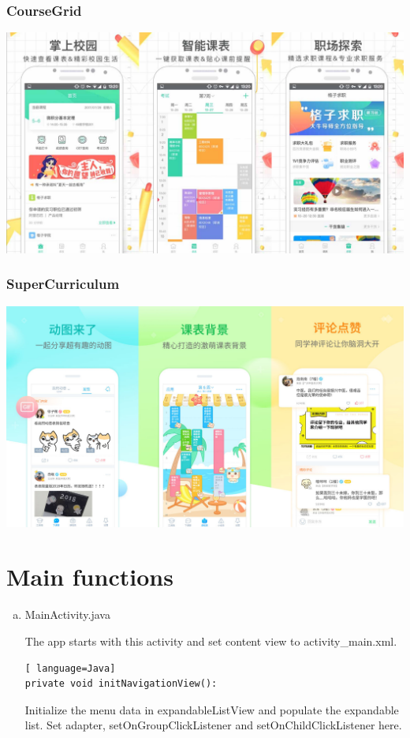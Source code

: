 \documentclass{article}
\begin{document}
    \subsubsection{CourseGrid}
    \begin{center}
        \includegraphics[width=6.5in]{CourseGrid}
    \end{center}

    \subsubsection{SuperCurriculum}
    \begin{center}
        \includegraphics[width=6.5in]{SuperCurriculum}
    \end{center}

    \section{Main functions}

    \begin{enumerate}[a)]
    \item MainActivity.java
    
    The app starts with this activity and 
    set content view to activity\_main.xml.

    \begin{lstlisting}[ language=Java]
private void initNavigationView():
    \end{lstlisting}
    Initialize the menu data in expandableListView and populate the expandable list. Set adapter, setOnGroupClickListener and setOnChildClickListener here.

    
    \end{enumerate}
    
\end{document}
